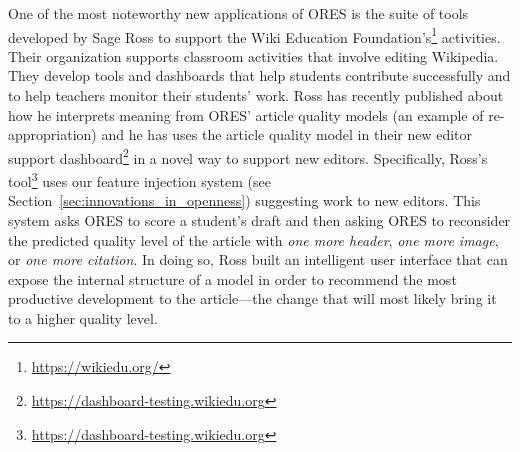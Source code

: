 One of the most noteworthy new applications of ORES is the suite of tools developed by Sage Ross to support the Wiki Education Foundation's\footnote{\url{https://wikiedu.org/}} activities.  Their organization supports classroom activities that involve editing Wikipedia.  They develop tools and dashboards that help students contribute successfully and to help teachers monitor their students' work.  Ross has recently published about how he interprets meaning from ORES' article quality models\cite{ross2016visualizing} (an example of re-appropriation) and he has uses the article quality model in their new editor support dashboard\footnote{\url{https://dashboard-testing.wikiedu.org}} in a novel way to support new editors.  Specifically, Ross's tool\footnote{\url{https://dashboard-testing.wikiedu.org}} uses our feature injection system (see Section~\ref{sec:innovations_in_openness}) suggesting work to new editors.  This system asks ORES to score a student's draft and then asking ORES to reconsider the predicted quality level of the article with \emph{one more header}, \emph{one more image}, or \emph{one more citation}. In doing so, Ross built an intelligent user interface that can expose the internal structure of a model in order to recommend the most productive development to the article---the change that will most likely bring it to a higher quality level.
